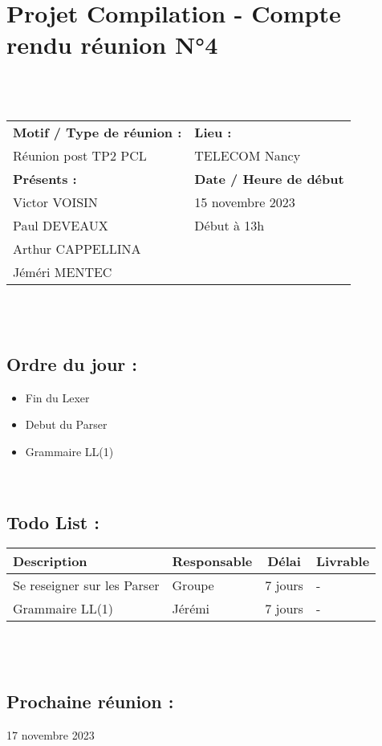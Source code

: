 \documentclass{article}
\begin{document}
\section*{Projet Compilation - Compte rendu réunion N°4}
~\\\\
\begin{tabular}{|p{7cm}|p{6cm}|}
    \hline
    \textbf{Motif / Type de réunion :}
    & \textbf{Lieu :}
    \\
    Réunion post TP2 PCL
    &
    TELECOM Nancy
    \\ \hline
    \textbf{Présents :}
    &
    \textbf{Date / Heure de début}
    \\
    Victor VOISIN &  15 novembre 2023\\
    Paul DEVEAUX & Début à 13h\\
    Arthur CAPPELLINA & \\
    Jéméri MENTEC &
    \\ \hline
\end{tabular}
\\\\

\subsection*{Ordre du jour :}
\begin{itemize}
    \item{Fin du Lexer}
    \item{Debut du Parser}
    \item{Grammaire LL(1)}
\end{itemize}
~

\subsection*{Todo List :}
\renewcommand{\arraystretch}{1.5}
\begin{tabular}{|p{5cm}|l|c|p{4.5cm}|}
    \hline
    Description & Responsable & Délai & Livrable\\ 
    \hline
    Se reseigner sur les Parser & Groupe  & 7 jours & - \\
    Grammaire LL(1) & Jérémi  & 7 jours & -\\
    \hline
\end{tabular}
\\\\

\subsection*{Prochaine réunion :} 17 novembre 2023
\end{document}
